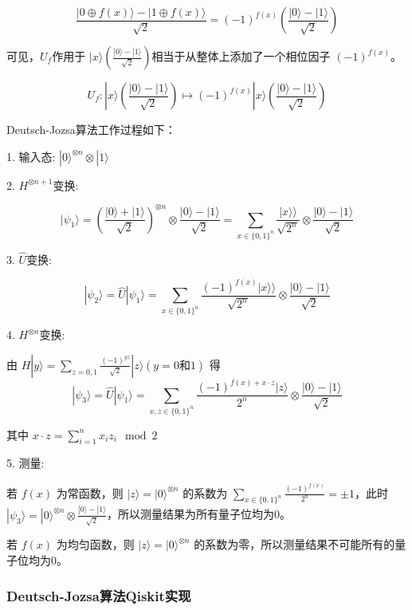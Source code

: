 \[ \frac{|0 \oplus f(x)\rangle - |1 \oplus f(x)\rangle}{\sqrt{2}} = (-1)^{f(x)} \left( \frac{|0\rangle - |1\rangle}{\sqrt{2}} \right) \]

可见，$U_f$作用于 $|x\rangle \left( \frac{|0\rangle - |1\rangle}{\sqrt{2}} \right)$相当于从整体上添加了一个相位因子 $(-1)^{f(x)}$。

\[ U_f : |x\rangle \left( \frac{|0\rangle - |1\rangle}{\sqrt{2}} \right) \mapsto (-1)^{f(x)} |x\rangle \left( \frac{|0\rangle - |1\rangle}{\sqrt{2}} \right) \]

Deutsch-Jozsa算法工作过程如下：

1. 输入态: $|0\rangle^{\otimes n} \otimes |1\rangle$

2. $H^{\otimes n+1}$变换:

\[
|\psi_1\rangle = \left( \frac{|0\rangle + |1\rangle}{\sqrt{2}} \right)^{\otimes n} \otimes \frac{|0\rangle - |1\rangle}{\sqrt{2}} = \sum_{x \in \{0,1\}^n} \frac{|x\rangle\rangle}{\sqrt{2^n}} \otimes \frac{|0\rangle - |1\rangle}{\sqrt{2}}
\]

3. $\hat{U}$变换:

\[
|\psi_2\rangle = \hat{U}|\psi_1\rangle = \sum_{x \in \{0,1\}^n} \frac{(-1)^{f(x)}|x\rangle\rangle}{\sqrt{2^n}} \otimes \frac{|0\rangle - |1\rangle}{\sqrt{2}}
\]

4. $H^{\otimes n}$变换:

由 $H|y\rangle = \sum_{z=0,1} \frac{(-1)^{yz}}{\sqrt{2}} |z\rangle (y = 0 \text{和} 1)$ 得
\[
|\psi_3\rangle = \hat{U}|\psi_1\rangle = \sum_{x,z \in \{0,1\}^n} \frac{(-1)^{f(x) + x \cdot z}|z\rangle}{2^n} \otimes \frac{|0\rangle - |1\rangle}{\sqrt{2}}
\]

其中 $x \cdot z = \sum_{i=1}^{n} x_i z_i \mod 2$

5. 测量:

若 $f(x)$ 为常函数，则 $|z\rangle = |0\rangle^{\otimes n}$ 的系数为 $\sum_{x \in \{0,1\}^n} \frac{(-1)^{f(x)}}{2^n} = \pm 1$，此时 $|\psi_3\rangle = |0\rangle^{\otimes n} \otimes \frac{|0\rangle - |1\rangle}{\sqrt{2}}$，所以测量结果为所有量子位均为0。

若 $f(x)$ 为均匀函数，则 $|z\rangle = |0\rangle^{\otimes n}$ 的系数为零，所以测量结果不可能所有的量子位均为0。

\subsubsection{Deutsch-Jozsa算法Qiskit实现}

